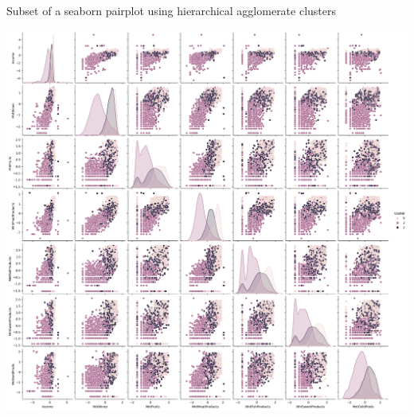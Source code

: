 \documentclass[12pt]{article}
\begin{document}
Subset of a seaborn pairplot using hierarchical agglomerate clusters
\begin{center}
    \includegraphics[width=6.5in]{images/pairplot.png}
\end{center}
\end{document}
